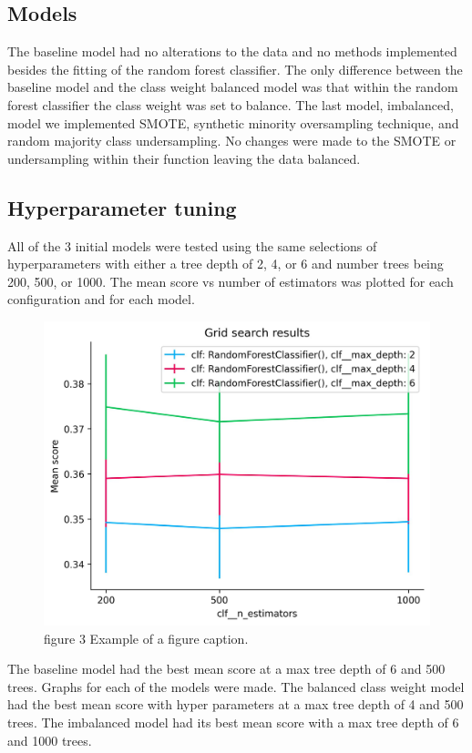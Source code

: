 \documentclass[conference]{IEEEtran}
\begin{document}
\subsection{Models}
The baseline model had no alterations to the data and no methods implemented besides the fitting of the random forest classifier. The only difference between the baseline model and the class weight balanced model was that within the random forest classifier the class weight was set to balance. The last model, imbalanced, model we implemented SMOTE, synthetic minority oversampling technique, and random majority class undersampling. No changes were made to the SMOTE or undersampling within their function leaving the data balanced.
\subsection{Hyperparameter tuning}
All of the 3 initial models were tested using the same selections of hyperparameters with either a tree depth of 2, 4, or 6 and number trees being 200, 500, or 1000. The mean score vs number of estimators was plotted for each configuration and for each model. 
\begin{figure}[htbp]
	\centerline{\includegraphics[width=\linewidth]{Graphs/GridSearch_rf_base.jpg}}
	\caption{figure 3 Example of a figure caption.}
	\label{GridSearch_rf_base}
\end{figure}
The baseline model had the best mean score at a max tree depth of 6 and 500 trees. Graphs for each of the models were made. The balanced class weight model had the best mean score with hyper parameters at a max tree depth of 4 and 500 trees. The imbalanced model had its best mean score with a max tree depth of 6 and 1000 trees. 
\end{document}
